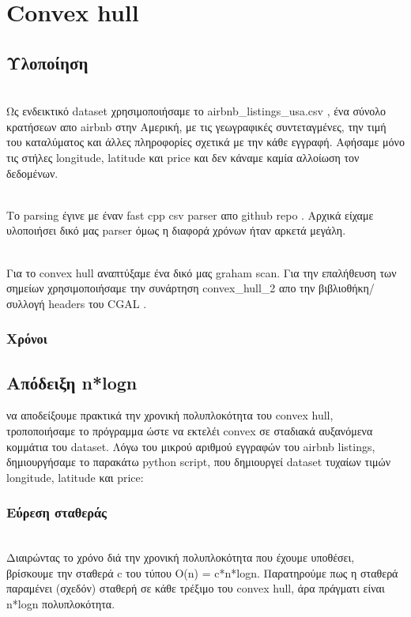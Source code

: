 \section{Convex hull}

\subsection{Υλοποίηση}

\\Ως ενδεικτικό dataset χρησιμοποιήσαμε το airbnb\_listings\_usa.csv \cite{airbnb}, ένα σύνολο κρατήσεων απο airbnb στην Αμερική, με τις γεωγραφικές συντεταγμένες, την τιμή του καταλύματος και άλλες πληροφορίες σχετικά με την κάθε εγγραφή. Αφήσαμε μόνο τις στήλες longitude, latitude και price και δεν κάναμε καμία αλλοίωση τον δεδομένων.

\\Το parsing έγινε με έναν fast cpp csv parser απο github repo \cite{fastcsv}. Αρχικά είχαμε υλοποιήσει δικό μας parser όμως η διαφορά χρόνων ήταν αρκετά μεγάλη.

\\Για το convex hull αναπτύξαμε ένα δικό μας graham scan. Για την επαλήθευση των σημείων χρησιμοποιήσαμε την συνάρτηση convex\_hull\_2 απο την βιβλιοθήκη/συλλογή headers του CGAL \cite{CGAL}.

\subsubsection{Χρόνοι}


\newpage
\subsection{Απόδειξη n*logn}
 να αποδείξουμε πρακτικά την χρονική πολυπλοκότητα του convex hull, τροποποιήσαμε το πρόγραμμα ώστε να εκτελέι convex σε σταδιακά αυξανόμενα κομμάτια του dataset. Λόγω του μικρού αριθμού εγγραφών του airbnb listings, δημιουργήσαμε το παρακάτω python script, που δημιουργεί dataset τυχαίων τιμών longitude, latitude και price:

\subsubsection{Εύρεση σταθεράς}
\\Διαιρώντας το χρόνο διά την χρονική πολυπλοκότητα που έχουμε υποθέσει, βρίσκουμε την σταθερά c του τύπου O(n) = c*n*logn. Παρατηρούμε πως η σταθερά παραμένει (σχεδόν) σταθερή σε κάθε τρέξιμο του convex hull, άρα πράγματι είναι n*logn πολυπλοκότητα.

